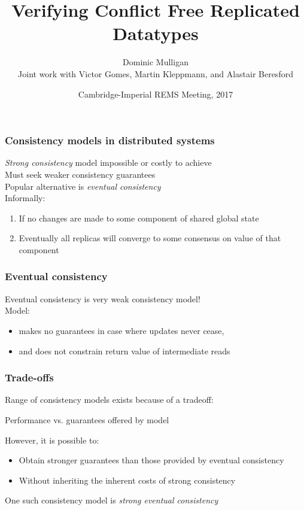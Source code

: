 \documentclass[professionalfonts,smallfonts]{beamer}
\author{Dominic Mulligan \\ Joint work with Victor Gomes, Martin Kleppmann, and Alastair Beresford}
\title{Verifying Conflict Free Replicated Datatypes}
\date{Cambridge-Imperial REMS Meeting, 2017}
\begin{document}
\begin{frame}
\maketitle
\end{frame}


\begin{frame}
\frametitle{Consistency models in distributed systems}
\emph{Strong consistency} model impossible or costly to achieve
\\[1.5ex]
Must seek weaker consistency guarantees
\\[1.5ex]
Popular alternative is \emph{eventual consistency}
\\[1.5ex]
Informally:
\begin{enumerate}
\item
If no changes are made to some component of shared global state
\item
Eventually all replicas will converge to some consensus on value of that component
\end{enumerate}
\end{frame}

\begin{frame}
\frametitle{Eventual consistency}
Eventual consistency is very weak consistency model!
\\[1.5ex]
Model:
\begin{itemize}
\item
makes no guarantees in case where updates never cease,
\item
and does not constrain return value of intermediate reads
\end{itemize}
\end{frame}

\begin{frame}
\frametitle{Trade-offs}
Range of consistency models exists because of a tradeoff:
\begin{center}
Performance vs. guarantees offered by model
\end{center}
\vspace{\baselineskip}
However, it is possible to:
\begin{itemize}
\item
Obtain stronger guarantees than those provided by eventual consistency
\item
Without inheriting the inherent costs of strong consistency
\end{itemize}
\vspace{\baselineskip}
One such consistency model is \emph{strong eventual consistency}
\end{frame}
\end{document}
